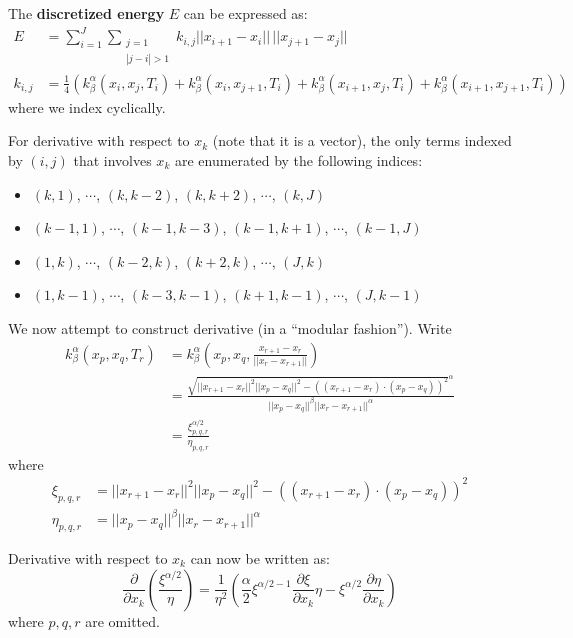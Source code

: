 \documentclass[a4paper]{article}
\newcommand{\norm}[1]{||#1||}
\begin{document}
The \textbf{discretized energy} $E$ can be expressed as:
\begin{align}
    E &= \sum_{i = 1}^{J} \sum_{\substack{j = 1 \\ |j-i| > 1}} k_{i,j} \norm{x_{i+1} - x_i} \, \norm{x_{j+1} - x_j} 
    \label{equ: Discretized Energy}
    \\
    k_{i,j} &= \frac{1}{4} \left( 
        k_{\beta}^{\alpha} \left( x_i, x_j, T_i \right)
        + k_{\beta}^{\alpha} \left( x_i, x_{j+1}, T_i \right)
        + k_{\beta}^{\alpha} \left( x_{i+1}, x_j, T_i \right)
        + k_{\beta}^{\alpha} \left( x_{i+1}, x_{j+1}, T_i \right)
    \right)
\end{align}
where we index cyclically.

For derivative with respect to $x_k$ (note that it is a vector), the only terms indexed by
$(i,j)$ that involves $x_k$ are enumerated by the following indices:
\begin{itemize}
    \item $(k,1)$, $\cdots$, $(k, k-2)$, $(k, k+2)$, $\cdots$, $(k,J)$
    \item $(k-1,1)$, $\cdots$, $(k-1, k-3)$, $(k-1, k+1)$, $\cdots$, $(k-1,J)$
    \item $(1,k)$, $\cdots$, $(k-2, k)$, $(k+2, k)$, $\cdots$, $(J,k)$
    \item $(1,k-1)$, $\cdots$, $(k-3, k-1)$, $(k+1, k-1)$, $\cdots$, $(J,k-1)$
\end{itemize}

We now attempt to construct derivative (in a ``modular fashion'').
Write 
\begin{align}
    k_{\beta}^{\alpha} \left( x_p, x_q, T_r \right) &= k_{\beta}^{\alpha} \left( x_p, x_q, \frac{x_{r+1} - x_{r}}{\norm{x_{r} - x_{r+1}}} \right)
    \\
    &= \frac{\sqrt{\norm{x_{r+1} - x_r}^2 \norm{x_p - x_q}^2- \left( \left( x_{r+1} - x_{r} \right) \cdot \left( x_{p} - x_{q} \right) \right)^2}^{\alpha} }{\norm{x_p - x_q}^{\beta} \norm{x_r - x_{r+1}}^{\alpha}} \\
    &= \frac{\xi_{p,q,r}^{\alpha/2}}{\eta_{p,q,r}}
\end{align}
where
\begin{align}
    \xi_{p,q,r} &= \norm{x_{r+1} - x_r}^2 \norm{x_p - x_q}^2- \left( \left( x_{r+1} - x_{r} \right) \cdot \left( x_{p} - x_{q} \right) \right)^2 \\
    \eta_{p,q,r} &= \norm{x_p - x_q}^{\beta} \norm{x_r - x_{r+1}}^{\alpha}
\end{align}

Derivative with respect to $x_k$ can now be written as:
\begin{equation}
    \frac{\partial}{\partial x_k} \left( \frac{\xi^{\alpha/2}}{\eta} \right) = \frac{1}{\eta^2} \left( \frac{\alpha}{2} \xi^{\alpha/2 - 1} \frac{\partial \xi}{\partial x_k} \eta - \xi^{\alpha/2} \frac{\partial \eta}{\partial x_k} \right)
\end{equation}
where $p,q,r$ are omitted.
\end{document}
